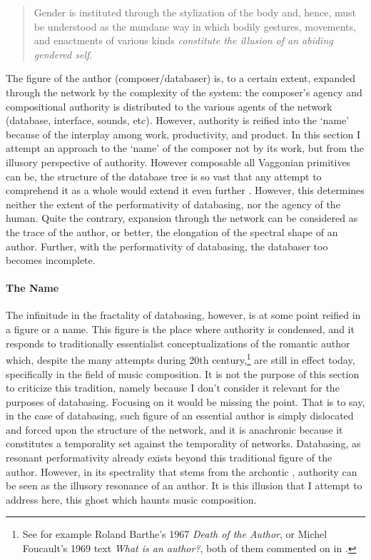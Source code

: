 \begin{quote}
	Gender is instituted through the stylization of the body and, hence, must be understood as the mundane way in which bodily gestures, movements, and enactments of various kinds \textit{constitute the illusion of an abiding gendered self}. \im \parencite[519]{But88:Per}
\end{quote}

The figure of the author (composer/databaser) is, to a certain extent, expanded through the network by the complexity of the system: the composer's agency and compositional authority is distributed to the various agents of the network (database, interface, sounds, etc). However, authority is reified into the `name' because of the interplay among work, productivity, and product. In this section I attempt an approach to the `name' of the composer not by its work, but from the illusory perspective of authority. However composable all Vaggonian primitives can be, the structure of the database tree is so vast that any attempt to comprehend it as a whole would extend it even further . However, this determines neither the extent of the performativity of databasing, nor the agency of the human. Quite the contrary, expansion through the network can be considered as the trace of the author, or better, the elongation of the spectral shape of an author. Further, with the performativity of databasing, the databaser too becomes incomplete.

\paragraph{The Name}
The infinitude in the fractality of databasing, however, is at some point reified in a figure or a name. This figure is the place where authority is condensed, and it responds to traditionally essentialist conceptualizations of the romantic author which, despite the many attempts during 20th century,\footnote{See for example Roland Barthe's 1967 \textit{Death of the Author}, or Michel Foucault's 1969 text \textit{What is an author?}, both of them commented on in \parencite{Dan07:The}.} are still in effect today, specifically in the field of music composition. It is not the purpose of this section to criticize this tradition, namely because I don't consider it relevant for the purposes of databasing. Focusing on it would be missing the point. That is to say, in the case of databasing, such figure of an essential author is simply dislocated and forced upon the structure of the network, and it is anachronic because it constitutes a temporality set against the temporality of networks. Databasing, as resonant performativity already exists beyond this traditional figure of the author. However, in its spectrality that stems from the archontic , authority can be seen as the illusory resonance of an author. It is this illusion that I attempt to address here, this ghost which haunts music composition.

